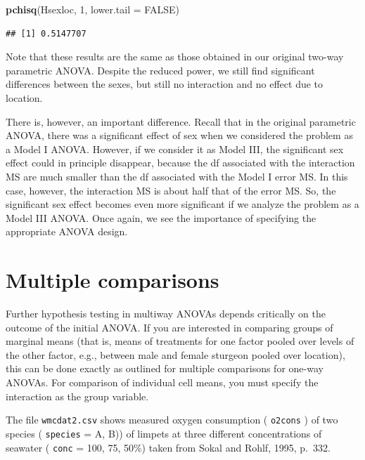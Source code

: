 \documentclass[
  12pt,
]{book}
\newenvironment{Shaded}{\begin{snugshade}}{\end{snugshade}}
\newcommand{\DataTypeTok}[1]{\textcolor[rgb]{0.13,0.29,0.53}{#1}}
\newcommand{\DecValTok}[1]{\textcolor[rgb]{0.00,0.00,0.81}{#1}}
\newcommand{\KeywordTok}[1]{\textcolor[rgb]{0.13,0.29,0.53}{\textbf{#1}}}
\newcommand{\NormalTok}[1]{#1}
\newcommand{\OtherTok}[1]{\textcolor[rgb]{0.56,0.35,0.01}{#1}}
\begin{document}
\begin{Shaded}
\begin{Highlighting}[]
\KeywordTok{pchisq}\NormalTok{(Hsexloc, }\DecValTok{1}\NormalTok{, }\DataTypeTok{lower.tail =} \OtherTok{FALSE}\NormalTok{)}
\end{Highlighting}
\end{Shaded}

\begin{verbatim}
## [1] 0.5147707
\end{verbatim}

Note that these results are the same as those obtained in our original two-way parametric ANOVA. Despite the reduced power, we still find significant differences between the sexes, but still no interaction and no effect due to location.

There is, however, an important difference. Recall that in the original parametric ANOVA, there was a significant effect of sex when we considered the problem as a Model I ANOVA. However, if we consider it as Model III, the significant sex effect could in principle disappear, because the df associated with the interaction MS are much smaller than the df associated with the Model I error MS. In this case, however, the interaction MS is about half that of the error MS. So, the significant sex effect becomes even more significant if we analyze the problem as a Model III ANOVA. Once again, we see the importance of specifying the appropriate ANOVA design.

\hypertarget{multiple-comparisons}{%
\section{Multiple comparisons}\label{multiple-comparisons}}

Further hypothesis testing in multiway ANOVAs depends critically on the outcome of the initial ANOVA. If you are interested in comparing groups of marginal means (that is, means of treatments for one factor pooled over levels of the other factor, e.g., between male and female sturgeon pooled over location), this can be done exactly as outlined for multiple comparisons for one-way ANOVAs. For comparison of individual cell means, you must specify the interaction as the group variable.

The file \texttt{wmcdat2.csv} shows measured oxygen consumption ( \texttt{o2cons} ) of two species ( \texttt{species} = A, B)) of limpets at three different concentrations of seawater ( \texttt{conc} = 100, 75, 50\%) taken from Sokal and Rohlf, 1995, p.~332.
\end{document}
